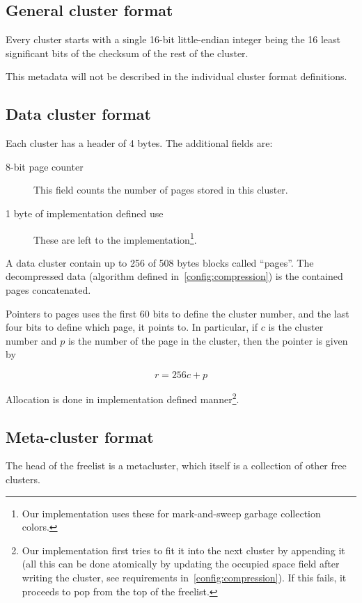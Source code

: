 \documentclass[11pt,a4paper]{report}
\newcommand{\clusterheader}{4 }
\newcommand{\clustersize}{512 }
\newcommand{\maxpagesincluster}{256 }
\newcommand{\pagesize}{508 } %
\begin{document}
        \subsection{General cluster format}
        Every cluster starts with a single 16-bit little-endian integer being
        the 16 least significant bits of the checksum of the rest of the
        cluster.

        This metadata will not be described in the individual cluster format
        definitions.

        \subsection{Data cluster format}
        Each cluster has a header of \clusterheader bytes. The additional
        fields are:

        \begin{description}
            \item [8-bit page counter] This field counts the number of pages
                stored in this cluster.
            \item [1 byte of implementation defined use] These are left to the
                implementation\footnote{Our implementation uses these for
                mark-and-sweep garbage collection colors.}.
        \end{description}

        A data cluster contain up to \maxpagesincluster of \pagesize bytes
        blocks called ``pages''. The decompressed data (algorithm defined
        in~\ref{config:compression}) is the contained pages concatenated.

        Pointers to pages uses the first 60 bits to define the cluster number,
        and the last four bits to define which page, it points to. In
        particular, if $c$ is the cluster number and $p$ is the number of the
        page in the cluster, then the pointer is given by

        $$r = \maxpagesincluster c + p$$

        Allocation is done in implementation defined manner\footnote{Our
        implementation first tries to fit it into the next cluster by
        appending it (all this can be done atomically by updating the
        occupied space field after writing the cluster, see requirements
        in~\ref{config:compression}). If this fails, it proceeds to pop
        from the top of the freelist.}.

        \subsection{Meta-cluster format}
        \label{cluster:metacluster}
        The head of the freelist is a metacluster, which itself is a collection
        of other free clusters.
\end{document}
